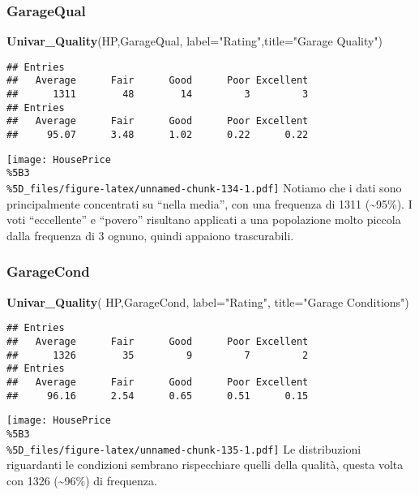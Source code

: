 \documentclass[
]{article}
\newenvironment{Shaded}{\begin{snugshade}}{\end{snugshade}}
\newcommand{\AttributeTok}[1]{\textcolor[rgb]{0.13,0.29,0.53}{#1}}
\newcommand{\FunctionTok}[1]{\textcolor[rgb]{0.13,0.29,0.53}{\textbf{#1}}}
\newcommand{\NormalTok}[1]{#1}
\newcommand{\StringTok}[1]{\textcolor[rgb]{0.31,0.60,0.02}{#1}}
\begin{document}
\subsubsection{GarageQual}\label{garagequal}

\begin{Shaded}
\begin{Highlighting}[]
\FunctionTok{Univar\_Quality}\NormalTok{(HP,GarageQual, }\AttributeTok{label=}\StringTok{"Rating"}\NormalTok{,}\AttributeTok{title=}\StringTok{"Garage Quality"}\NormalTok{)}
\end{Highlighting}
\end{Shaded}

\begin{verbatim}
## Entries
##   Average      Fair      Good      Poor Excellent 
##      1311        48        14         3         3 
## Entries
##   Average      Fair      Good      Poor Excellent 
##     95.07      3.48      1.02      0.22      0.22
\end{verbatim}

\texttt{[image: HousePrice\\\%5B3\\\%5D\_files/figure-latex/unnamed-chunk-134-1.pdf]}
Notiamo che i dati sono principalmente concentrati su ``nella media'',
con una frequenza di 1311 (\textasciitilde95\%). I voti ``eccellente'' e
``povero'' risultano applicati a una popolazione molto piccola dalla
frequenza di 3 ognuno, quindi appaiono trascurabili.

\subsubsection{GarageCond}\label{garagecond}

\begin{Shaded}
\begin{Highlighting}[]
\FunctionTok{Univar\_Quality}\NormalTok{(}
\NormalTok{  HP,GarageCond,}
  \AttributeTok{label=}\StringTok{"Rating"}\NormalTok{,}
  \AttributeTok{title=}\StringTok{"Garage Conditions"}\NormalTok{)}
\end{Highlighting}
\end{Shaded}

\begin{verbatim}
## Entries
##   Average      Fair      Good      Poor Excellent 
##      1326        35         9         7         2 
## Entries
##   Average      Fair      Good      Poor Excellent 
##     96.16      2.54      0.65      0.51      0.15
\end{verbatim}

\texttt{[image: HousePrice\\\%5B3\\\%5D\_files/figure-latex/unnamed-chunk-135-1.pdf]}
Le distribuzioni riguardanti le condizioni sembrano rispecchiare quelli
della qualità, questa volta con 1326 (\textasciitilde96\%) di frequenza.
\end{document}
